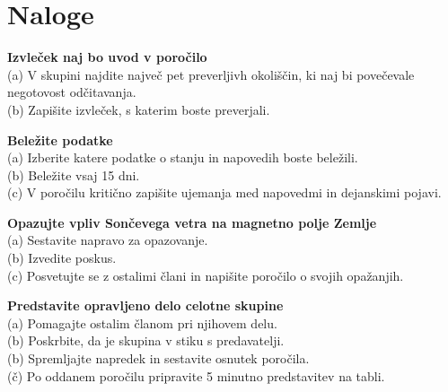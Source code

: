 

%
%
\section*{Naloge}
%
\begin{prob}
	\label{Nal:GnssPrak_Izvl}
	\textbf{Izvleček naj bo uvod v poročilo}\\
	(a) V skupini najdite največ pet preverljivh okoliščin, ki naj bi povečevale negotovost odčitavanja.\\
	(b) Zapišite izvleček, s katerim boste preverjali.
\end{prob}

\begin{prob}
	\label{Nal:GnssPrak_Belez}
	\textbf{Beležite podatke }\\
	(a) Izberite katere podatke o stanju in napovedih boste beležili.\\
	(b) Beležite vsaj 15 dni. \\
	(c) V poročilu kritično zapišite ujemanja med napovedmi in dejanskimi pojavi.
\end{prob}

\begin{prob}
	\label{Nal:GnssPrak_Eksp}
	\textbf{Opazujte vpliv Sončevega vetra na magnetno polje Zemlje}\\
	(a) Sestavite napravo za opazovanje.\\
	(b) Izvedite poskus. \\
	(c) Posvetujte se z ostalimi člani in napišite poročilo o svojih opažanjih.
\end{prob}

\begin{prob}
	\label{Nal:GnssPrak_Predst}
	\textbf{Predstavite opravljeno delo celotne skupine}\\
	(a) Pomagajte ostalim članom pri njihovem delu. \\
	(b) Poskrbite, da je skupina v stiku s predavatelji.\\
	(b) Spremljajte napredek in sestavite osnutek poročila. \\
	(č) Po oddanem poročilu pripravite 5 minutno predstavitev na tabli.
\end{prob}
%

